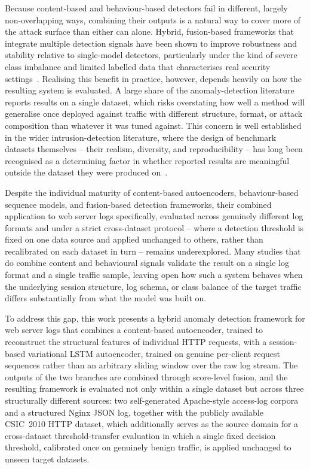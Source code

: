 \documentclass[futureinternet,article,submit,moreauthors]{Definitions/mdpi}
\begin{document}
Because content-based and behaviour-based detectors fail in different, largely non-overlapping ways, combining their outputs is a natural way to cover more of the attack surface than either can alone. Hybrid, fusion-based frameworks that integrate multiple detection signals have been shown to improve robustness and stability relative to single-model detectors, particularly under the kind of severe class imbalance and limited labelled data that characterises real security settings~\cite{kamal2025}. Realising this benefit in practice, however, depends heavily on how the resulting system is evaluated. A large share of the anomaly-detection literature reports results on a single dataset, which risks overstating how well a method will generalise once deployed against traffic with different structure, format, or attack composition than whatever it was tuned against. This concern is well established in the wider intrusion-detection literature, where the design of benchmark datasets themselves -- their realism, diversity, and reproducibility -- has long been recognised as a determining factor in whether reported results are meaningful outside the dataset they were produced on~\cite{shiravi2012}.

Despite the individual maturity of content-based autoencoders, behaviour-based sequence models, and fusion-based detection frameworks, their combined application to web server logs specifically, evaluated across genuinely different log formats and under a strict cross-dataset protocol -- where a detection threshold is fixed on one data source and applied unchanged to others, rather than recalibrated on each dataset in turn -- remains underexplored. Many studies that do combine content and behavioural signals validate the result on a single log format and a single traffic sample, leaving open how such a system behaves when the underlying session structure, log schema, or class balance of the target traffic differs substantially from what the model was built on.

To address this gap, this work presents a hybrid anomaly detection framework for web server logs that combines a content-based autoencoder, trained to reconstruct the structural features of individual HTTP requests, with a session-based variational LSTM autoencoder, trained on genuine per-client request sequences rather than an arbitrary sliding window over the raw log stream. The outputs of the two branches are combined through score-level fusion, and the resulting framework is evaluated not only within a single dataset but across three structurally different sources: two self-generated Apache-style access-log corpora and a structured Nginx JSON log, together with the publicly available CSIC~2010 HTTP dataset, which additionally serves as the source domain for a cross-dataset threshold-transfer evaluation in which a single fixed decision threshold, calibrated once on genuinely benign traffic, is applied unchanged to unseen target datasets.
\end{document}
